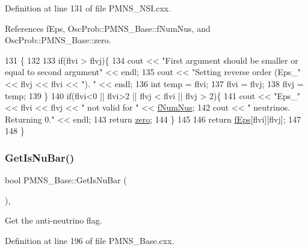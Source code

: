 Definition at line 131 of file P\+M\+N\+S\+\_\+\+N\+S\+I.\+cxx.



References f\+Eps, Osc\+Prob\+::\+P\+M\+N\+S\+\_\+\+Base\+::f\+Num\+Nus, and Osc\+Prob\+::\+P\+M\+N\+S\+\_\+\+Base\+::zero.


\begin{DoxyCode}
131                                                   \{
132 
133   \textcolor{keywordflow}{if}(flvi > flvj)\{
134     cout << \textcolor{stringliteral}{"First argument should be smaller or equal to second argument"} << endl;
135     cout << \textcolor{stringliteral}{"Setting reverse order (Eps\_"} << flvj << flvi << \textcolor{stringliteral}{"). "} << endl;
136     \textcolor{keywordtype}{int} temp = flvi;
137     flvi = flvj;
138     flvj = temp;
139   \}
140   \textcolor{keywordflow}{if}(flvi<0 || flvi>2 || flvj < flvi || flvj > 2)\{
141     cout << \textcolor{stringliteral}{"Eps\_"} << flvi << flvj << \textcolor{stringliteral}{" not valid for "} << \hyperlink{classOscProb_1_1PMNS__Base_a24bb74bed63569dfe88b18fa6a08060e}{fNumNus};
142     cout << \textcolor{stringliteral}{" neutrinos. Returning 0."} << endl;
143     \textcolor{keywordflow}{return} \hyperlink{classOscProb_1_1PMNS__Base_a5c31ed4593cf95feb36fb80c1850d25e}{zero};
144   \}
145 
146   \textcolor{keywordflow}{return} \hyperlink{classOscProb_1_1PMNS__NSI_a7e2f0a3fdc633f68523c9de0ce76e67d}{fEps}[flvi][flvj];
147 
148 \}
\end{DoxyCode}
\mbox{\label{classOscProb_1_1PMNS__Base_a2f7f2a028dfe7a90fff6b4f757972c2c}} 
\subsubsection{\texorpdfstring{Get\+Is\+Nu\+Bar()}{GetIsNuBar()}}
{\footnotesize\ttfamily bool P\+M\+N\+S\+\_\+\+Base\+::\+Get\+Is\+Nu\+Bar (\begin{DoxyParamCaption}{ }\end{DoxyParamCaption})\hspace{0.3cm}{\ttfamily [virtual]}, {\ttfamily [inherited]}}

Get the anti-\/neutrino flag. 

Definition at line 196 of file P\+M\+N\+S\+\_\+\+Base.\+cxx.



